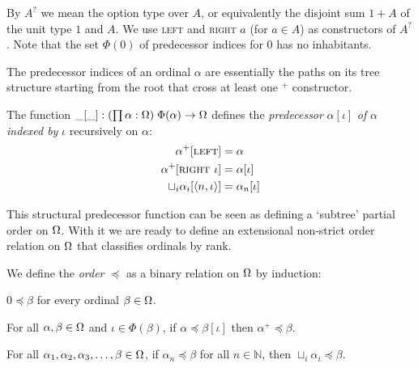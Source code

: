 By $A^?$ we mean the option type over $A$, or equivalently the
disjoint sum $1 + A$ of the unit type $1$ and $A$. We use
\textsc{left} and \textsc{right $a$} (for $a \in A$) as constructors
of $A^?$. Note that the set $\Phi(0)$ of predecessor indices for $0$
has no inhabitants.

The predecessor indices of an ordinal $\alpha$ are essentially the
paths on its tree structure starting from the root that cross at least
one $^+$ constructor.

\begin{definition}%
The function $\_[\_] : (\prod \alpha : \Omega) \; \Phi(\alpha)
\rightarrow \Omega$ defines the \emph{predecessor} $\alpha[\iota]$
\emph{of} $\alpha$ \emph{indexed by} $\iota$ recursively on $\alpha$:
\begin{align*}
  \alpha^+[\textsc{left}]                     &= \alpha \\
  \alpha^+[\textsc{right $\iota$}]            &= \alpha[\iota] \\
  \sqcup_i \alpha_i[\langle n, \iota \rangle] &= \alpha_n[\iota]
\end{align*}
\end{definition}


This structural predecessor function can be seen as defining a `subtree'
partial order on $\Omega$. With it we are ready to define an extensional
non-strict order relation on $\Omega$ that classifies ordinals by rank.

\begin{definition}\label{def:order}%
We define the \emph{order} $\preceq$ as a binary relation on $\Omega$ by
induction:
\begin{compactenum}
  \item
    $0 \preceq \beta$ for every ordinal $\beta \in \Omega$.
  \item\label{def:order:succ}
    For all $\alpha, \beta \in \Omega$ and $\iota \in \Phi(\beta)$, if
    $\alpha \preceq \beta[\iota]$ then $\alpha^+ \preceq \beta$.
  \item
    For all $\alpha_1, \alpha_2, \alpha_3, \ldots, \beta \in \Omega$, if
    $\alpha_n \preceq \beta$ for all $n \in \mathbb{N}$, then $\sqcup_i
    \alpha_i \preceq \beta$.
\end{compactenum}
\end{definition}


